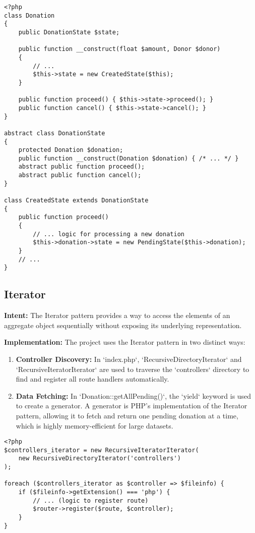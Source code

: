 \documentclass[11pt,a4paper]{article}
\begin{document}
\begin{lstlisting}[caption={The State pattern for the Donation lifecycle.}, label={lst:state}]
% Filepath: src\models\payments.php
<?php
class Donation
{
	public DonationState $state;

	public function __construct(float $amount, Donor $donor)
	{
		// ...
		$this->state = new CreatedState($this);
	}

	public function proceed() { $this->state->proceed(); }
	public function cancel() { $this->state->cancel(); }
}

abstract class DonationState
{
	protected Donation $donation;
	public function __construct(Donation $donation) { /* ... */ }
	abstract public function proceed();
	abstract public function cancel();
}

class CreatedState extends DonationState
{
	public function proceed()
	{
		// ... logic for processing a new donation
		$this->donation->state = new PendingState($this->donation);
	}
    // ...
}
\end{lstlisting}

\subsection{Iterator}
\textbf{Intent:} The Iterator pattern provides a way to access the elements of an aggregate object sequentially without exposing its underlying representation.

\textbf{Implementation:} The project uses the Iterator pattern in two distinct ways:
\begin{enumerate}
    \item \textbf{Controller Discovery:} In `index.php`, `RecursiveDirectoryIterator` and `RecursiveIteratorIterator` are used to traverse the `controllers` directory to find and register all route handlers automatically.
    \item \textbf{Data Fetching:} In `Donation::getAllPending()`, the `yield` keyword is used to create a generator. A generator is PHP's implementation of the Iterator pattern, allowing it to fetch and return one pending donation at a time, which is highly memory-efficient for large datasets.
\end{enumerate}

\begin{lstlisting}[caption={Using iterators for automatic route discovery.}, label={lst:iterator-discovery}]
% Filepath: src\index.php
<?php
$controllers_iterator = new RecursiveIteratorIterator(
	new RecursiveDirectoryIterator('controllers')
);

foreach ($controllers_iterator as $controller => $fileinfo) {
	if ($fileinfo->getExtension() === 'php') {
		// ... (logic to register route)
		$router->register($route, $controller);
	}
}
\end{lstlisting}
\end{document}
